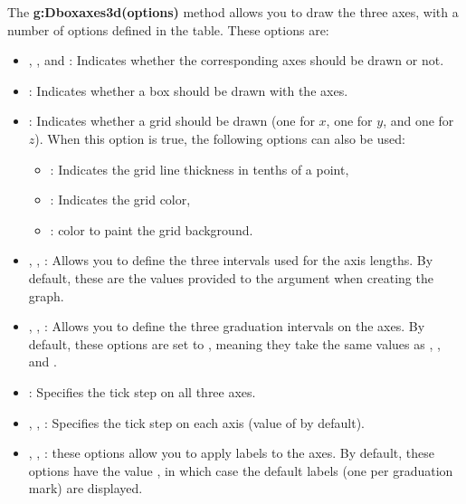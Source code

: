 The \textbf{g:Dboxaxes3d(options)} method allows you to draw the three axes, with a number of options defined in the  table. These options are:
\begin{itemize}
    \item {}, , and : Indicates whether the corresponding axes should be drawn or not.

    \item {}: Indicates whether a box should be drawn with the axes.

    \item {}: Indicates whether a grid should be drawn (one for $x$, one for $y$, and one for $z$). When this option is true, the following options can also be used:
\begin{itemize}
    \item {}: Indicates the grid line thickness in tenths of a point,
    \item {}: Indicates the grid color,
    \item {}: color to paint the grid background.
\end{itemize}

    \item {}, , : Allows you to define the three intervals used for the axis lengths. By default, these are the values ​​provided to the  argument when creating the graph.

    \item {}, , : Allows you to define the three graduation intervals on the axes. By default, these options are set to , meaning they take the same values ​​as , , and .

    \item {}: Specifies the tick step on all three axes.

    \item {}, , : Specifies the tick step on each axis (value of  by default).
    
    \item {}, , : these options allow you to apply labels to the axes. By default, these options have the value \nil, in which case the default labels (one per graduation mark) are displayed.


\end{itemize}
